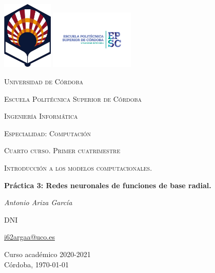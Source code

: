 \begin{titlepage}
\centering
\includegraphics[width=0.18\textwidth]{img/logo_uco_sin_texto.png}
\includegraphics[width=0.30\textwidth]{img/logo_uco_epsc.png}\par\vspace{1cm}
{\scshape\LARGE Universidad de Córdoba\par}
{\scshape\Large Escuela Politécnica Superior de Córdoba\par}
\vspace{1cm}
{\scshape\LARGE Ingeniería Informática\par}
{\scshape\Large Especialidad: Computación\par}
{\scshape\Large Cuarto curso. Primer cuatrimestre\par}
\vspace{1.5cm}
{\scshape\LARGE Introducción a los modelos computacionales.\par}
\vspace{1.5cm}
{\huge\bfseries Práctica 3: Redes neuronales de funciones de base radial.\par}
\vspace{1.2cm}
{\Large\itshape Antonio Ariza García\par}
DNI\par
\href{mailto:correo@uco.es}{i62argaa@uco.es}\par
\vfill

{\large Curso académico 2020-2021\\Córdoba, \today\par}
\end{titlepage}